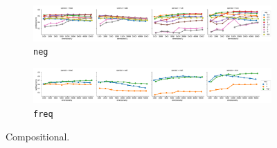 \begin{figure}
  \centering

  \begin{subfigure}[t]{\textwidth}
    \includegraphics[width=1.1\textwidth]{supplement/figures/compositional-interaction-neg}

  \caption{\texttt{neg}}
  \label{fig:compositional-neg}
  \end{subfigure}

  \begin{subfigure}[t]{\textwidth}
    \includegraphics[width=1.1\textwidth]{supplement/figures/compositional-interaction-freq}

  \caption{\texttt{freq}}
  \label{fig:compositional-freq}
  \end{subfigure}

  \caption{Compositional.}
\end{figure}
